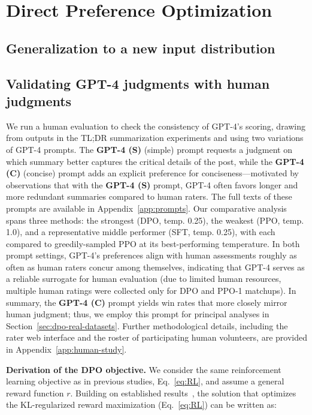 \section{Direct Preference Optimization}\label{sec:DPO}

\label{sec:theory}

\subsection{Generalization to a new input distribution}

\subsection{Validating GPT-4 judgments with human judgments}
\label{sec:human-judgments}
We run a human evaluation to check the consistency of GPT-4's scoring, drawing from outputs in the TL;DR summarization experiments and using two variations of GPT-4 prompts. The \textbf{GPT-4 (S)} (simple) prompt requests a judgment on which summary better captures the critical details of the post, while the \textbf{GPT-4 (C)} (concise) prompt adds an explicit preference for conciseness—motivated by observations that with the \textbf{GPT-4 (S)} prompt, GPT-4 often favors longer and more redundant summaries compared to human raters. The full texts of these prompts are available in Appendix~\ref{app:prompts}. Our comparative analysis spans three methods: the strongest (DPO, temp. 0.25), the weakest (PPO, temp. 1.0), and a representative middle performer (SFT, temp. 0.25), with each compared to greedily-sampled PPO at its best-performing temperature. In both prompt settings, GPT-4's preferences align with human assessments roughly as often as human raters concur among themselves, indicating that GPT-4 serves as a reliable surrogate for human evaluation (due to limited human resources, multiple human ratings were collected only for DPO and PPO-1 matchups). In summary, the \textbf{GPT-4 (C)} prompt yields win rates that more closely mirror human judgment; thus, we employ this prompt for principal analyses in Section~\ref{sec:dpo-real-datasets}. Further methodological details, including the rater web interface and the roster of participating human volunteers, are provided in Appendix~\ref{app:human-study}.

\textbf{Derivation of the DPO objective.} We consider the same reinforcement learning objective as in previous studies, Eq.~\ref{eq:RL}, and assume a general reward function $r$. Building on established results~\citep{peters2007reinforcement, peng2019advantage, korbak2022reinforcement, go2023aligning}, the solution that optimizes the KL-regularized reward maximization (Eq.~\ref{eq:RL}) can be written as:

